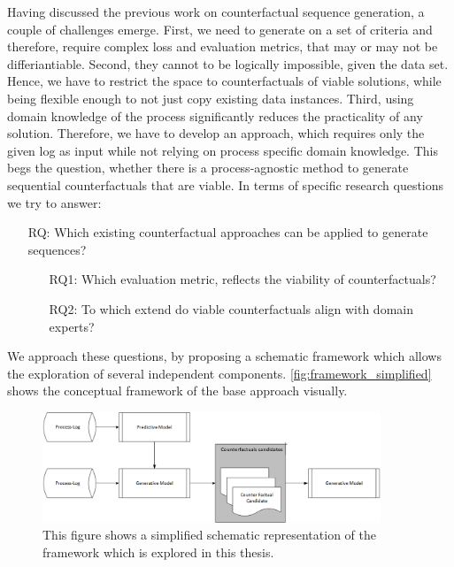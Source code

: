 \documentclass[./../../paper.tex]{subfiles}
\begin{document}
Having discussed the previous work on counterfactual sequence generation, a couple of challenges emerge. 
First, we need to generate on a set of criteria and therefore, require complex loss and evaluation metrics, that may or may not be differiantiable. Second, they cannot to be logically impossible, given the data set. 
Hence, we have to restrict the space to counterfactuals of viable solutions, while being flexible enough to not just copy existing data instances. 
Third, using domain knowledge of the process significantly reduces the practicality of any solution. Therefore, we have to develop an approach, which requires only the given log as input while not relying on process specific domain knowledge. This begs the question, whether there is a process-agnostic method to generate sequential counterfactuals that are viable. In terms of specific research questions we try to answer:

\begin{itemize}
    \item[RQ:] Which existing counterfactual approaches can be applied to generate sequences?
    \begin{itemize}
        \item[RQ1:] Which evaluation metric, reflects the viability of counterfactuals?
        \item[RQ2:] To which extend do viable counterfactuals align with domain experts?  
    \end{itemize}
\end{itemize}

\noindent We approach these questions, by proposing a schematic framework which allows the exploration of several independent components. \autoref{fig:framework_simplified} shows the conceptual framework of the base approach visually.

\begin{figure}[htb]
    \label{fig:framework_simplified}
    \centering
    \includegraphics[width=0.9\textwidth]{figures/framework_simplified.png}
    \caption{This figure shows a simplified schematic representation of the framework which is explored in this thesis.}
\end{figure}
\end{document}
